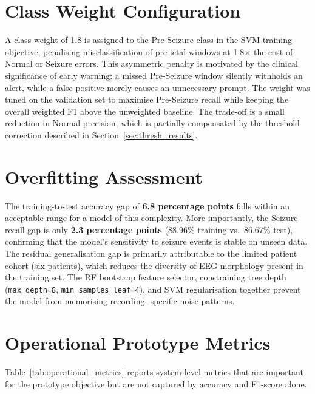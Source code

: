 \documentclass[12pt, a4paper]{report}
\begin{document}
\section{Class Weight Configuration}
\label{sec:classweight_results}

A class weight of 1.8 is assigned to the Pre-Seizure class in the SVM
training objective, penalising misclassification of pre-ictal windows at
1.8$\times$ the cost of Normal or Seizure errors. This asymmetric penalty
is motivated by the clinical significance of early warning: a missed
Pre-Seizure window silently withholds an alert, while a false positive
merely causes an unnecessary prompt. The weight was tuned on the validation
set to maximise Pre-Seizure recall while keeping the overall weighted F1
above the unweighted baseline. The trade-off is a small reduction in Normal
precision, which is partially compensated by the threshold correction
described in Section~\ref{sec:thresh_results}.

\section{Overfitting Assessment}
\label{sec:overfit_results}

The training-to-test accuracy gap of \textbf{6.8 percentage points} falls
within an acceptable range for a model of this complexity. More importantly,
the Seizure recall gap is only \textbf{2.3 percentage points}
(88.96\% training vs.\ 86.67\% test), confirming that the model's
sensitivity to seizure events is stable on unseen data. The residual
generalisation gap is primarily attributable to the limited patient cohort
(six patients), which reduces the diversity of EEG morphology present in
the training set. The RF bootstrap feature selector, constraining tree
depth (\texttt{max\_depth=8}, \texttt{min\_samples\_leaf=4}), and
SVM regularisation together prevent the model from memorising recording-
specific noise patterns.

\section{Operational Prototype Metrics}

Table~\ref{tab:operational_metrics} reports system-level metrics that are
important for the prototype objective but are not captured by accuracy and
F1-score alone.
\end{document}
